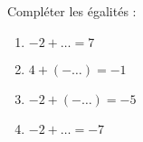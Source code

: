 
\begin{exercice}\label{exosmath-0723}

Compléter les égalités :
\begin{enumerate}
    \item
        \( -2+\ldots=7\)
    \item
        \( 4+(-\ldots)=-1\)
    \item
        \( -2+(-\ldots)=-5\)
    \item
        \( -2+\ldots=-7\)
\end{enumerate}

\end{exercice}
